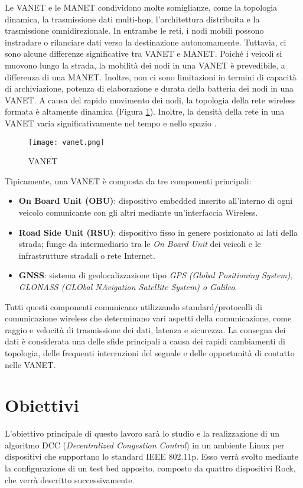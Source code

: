 Le VANET e le MANET condividono molte somiglianze, come la topologia dinamica, la trasmissione dati multi-hop, l'architettura distribuita e la trasmissione omnidirezionale. In entrambe le reti, i nodi mobili possono instradare o rilanciare dati verso la destinazione autonomamente. Tuttavia, ci sono alcune differenze significative tra VANET e MANET. Poiché i veicoli si muovono lungo la strada, la mobilità dei nodi in una VANET è prevedibile, a differenza di una MANET. Inoltre, non ci sono limitazioni in termini di capacità di archiviazione, potenza di elaborazione e durata della batteria dei nodi in una VANET. A causa del rapido movimento dei nodi, la topologia della rete wireless formata è altamente dinamica (Figura \ref{fig:vanet}). Inoltre, la densità della rete in una VANET varia significativamente nel tempo e nello spazio \cite{anwer2014survey} \cite{vehicular-ad-hoc}.

\begin{figure}[h!]
    \centering
    \texttt{[image: vanet.png]}
    \caption{VANET}
    \label{fig:vanet}
\end{figure}

Tipicamente, una VANET è composta da tre componenti principali: 
\begin{itemize}
    \item \textbf{On Board Unit (OBU)}: dispositivo embedded inserito all'interno di ogni veicolo comunicante con gli altri mediante un'interfaccia Wireless.
    \item \textbf{Road Side Unit (RSU)}: dispositivo fisso in genere posizionato ai lati della strada; funge da intermediario tra le \textit{On Board Unit} dei veicoli e le infrastrutture stradali o rete Internet.
    \item \textbf{GNSS}: sistema di geolocalizzazione tipo \textit{GPS (Global Positioning System), GLONASS (GLObal NAvigation Satellite System) o Galileo}.
\end{itemize}

Tutti questi componenti comunicano utilizzando standard/protocolli di comunicazione wireless che determinano vari aspetti della comunicazione, come raggio e velocità di trasmissione dei dati, latenza e sicurezza. La consegna dei dati è considerata una delle sfide principali a causa dei rapidi cambiamenti di topologia, delle frequenti interruzioni del segnale e delle opportunità di contatto nelle VANET. 

\section{Obiettivi}
L'obiettivo principale di questo lavoro sarà lo studio e la realizzazione di un algoritmo DCC (\textit{Decentralized Congestion Control}) in un ambiente Linux per dispositivi che supportano lo standard IEEE 802.11p. Esso verrà svolto mediante la configurazione di un test bed apposito, composto da quattro dispositivi Rock, che verrà descritto successivamente.

